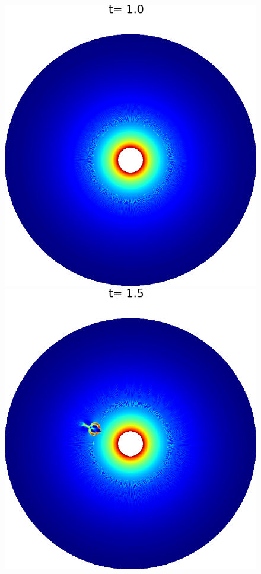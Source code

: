 \documentclass[preprint, 11pt]{article}
\begin{document}
\begin{figure}[!h]
  \centering 
  \includegraphics[scale=0.28]{figures/chj_r1_roe_p1.png} \quad
  \includegraphics[scale=0.28]{figures/chj_r1_roe_p2.png} \quad

\end{figure}
\end{document}
